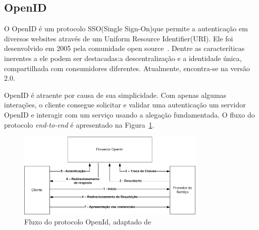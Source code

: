 

\subsection{OpenID}

O OpenID é um protocolo SSO(Single Sign-On)que permite a autenticação em diversos websites através de um Uniform Resource Identifier(URI). Ele foi desenvolvido em 2005 pela comunidade open source~\cite{Recordon2006}. Dentre as caracteríticas inerentes a ele podem ser destacadas:a descentralização e a identidade única, compartilhada com consumidores diferentes. Atualmente, encontra-se na versão 2.0.

OpenID é atraente por causa de sua simplicidade. Com apenas algumas interações, o cliente consegue solicitar e validar  uma autenticação um servidor OpenID e interagir com um serviço usando a alegação fundamentada. O fluxo do protocolo \emph{end-to-end} é apresentado na Figura~\ref{fig:openid}.

\begin{figure}[!htb]
\centering
\includegraphics[width=0.8\textwidth]{openiddiagram.png}
\caption{Fluxo do protocolo OpenId, adaptado de~\cite{rfc6749}}
\label{fig:openid}
\end{figure}

